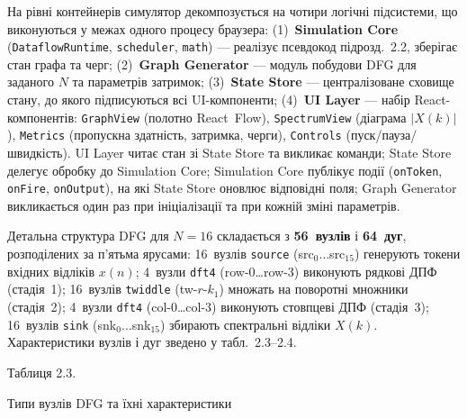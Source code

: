 На рівні контейнерів симулятор декомпозується на чотири логічні
підсистеми, що виконуються у межах одного процесу браузера:
(1)~\textbf{Simulation Core} (\texttt{DataflowRuntime}, \texttt{scheduler},
\texttt{math}) --- реалізує псевдокод підрозд.~2.2, зберігає стан графа
та черг; (2)~\textbf{Graph Generator} --- модуль побудови DFG для
заданого \(N\) та параметрів затримок; (3)~\textbf{State Store} ---
централізоване сховище стану, до якого підписуються всі UI-компоненти;
(4)~\textbf{UI Layer} --- набір React-компонентів: \texttt{GraphView}
(полотно React~Flow), \texttt{SpectrumView} (діаграма \(|X(k)|\)),
\texttt{Metrics} (пропускна здатність, затримка, черги),
\texttt{Controls} (пуск/пауза/швидкість). UI Layer читає стан зі State
Store та викликає команди; State Store делегує обробку до Simulation
Core; Simulation Core публікує події (\texttt{onToken}, \texttt{onFire},
\texttt{onOutput}), на які State Store оновлює відповідні поля; Graph
Generator викликається один раз при ініціалізації та при кожній зміні
параметрів.

Детальна структура DFG для \(N=16\) складається з \textbf{56~вузлів} і
\textbf{64~дуг}, розподілених за п'ятьма ярусами: 16~вузлів
\texttt{source} (src\(_{0}\ldots\)src\(_{15}\)) генерують токени вхідних
відліків \(x(n)\); 4~вузли \texttt{dft4} (row-0\ldots row-3) виконують
рядкові ДПФ (стадія~1); 16~вузлів \texttt{twiddle} (tw-\(r\)-\(k_{1}\))
множать на поворотні множники (стадія~2); 4~вузли \texttt{dft4}
(col-0\ldots col-3) виконують стовпцеві ДПФ (стадія~3); 16~вузлів
\texttt{sink} (snk\(_{0}\ldots\)snk\(_{15}\)) збирають спектральні
відліки \(X(k)\). Характеристики вузлів і дуг зведено у
табл.~2.3--2.4.

Таблиця 2.3.

Типи вузлів DFG та їхні характеристики

